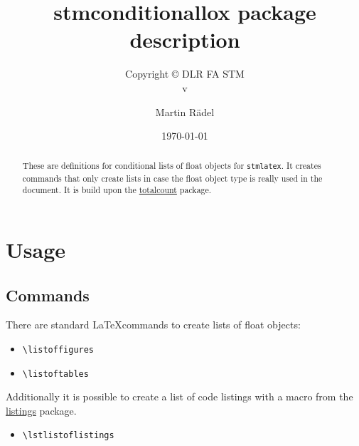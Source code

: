 \documentclass[listof=totoc]{scrartcl}
\author{Martin R\"{a}del}
\title{stmconditionallox package description}
\subtitle{Copyright \copyright{} \the\year{} DLR FA STM\\v\formatdate[versiondatestyle]{\DTMToday}}
\date{\today}
\begin{document}
\maketitle

\begin{abstract}
These are definitions for conditional lists of float objects for \texttt{stmlatex}. It creates commands that only create lists in case the float object type is really used in the document. It is build upon the \href{https://ctan.org/pkg/totalcount}{totalcount} package.
\end{abstract}

\tableofcontents

\conditionallistoffigures  %
\conditionallistoftables   %
\conditionallistoflistings %

\section{Usage}

\subsection{Commands}

There are standard \LaTeX commands to create lists of float objects:

\begin{itemize}
  \item \verb+\listoffigures+
  \item \verb+\listoftables+
\end{itemize}

Additionally it is possible to create a list of code listings with a macro from the \href{https://ctan.org/pkg/listings}{listings} package.

\begin{itemize}
  \item \verb+\lstlistoflistings+
\end{itemize}

\end{document}
